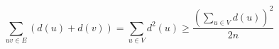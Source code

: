 \documentclass{article}
\begin{document}
\[\sum_{uv\in E}(d(u)+d(v))=\sum_{u\in V}d^2(u)\geq \dfrac{\left( \sum_{u\in V}d(u)\right)^2}{2n}\]
\end{document}

